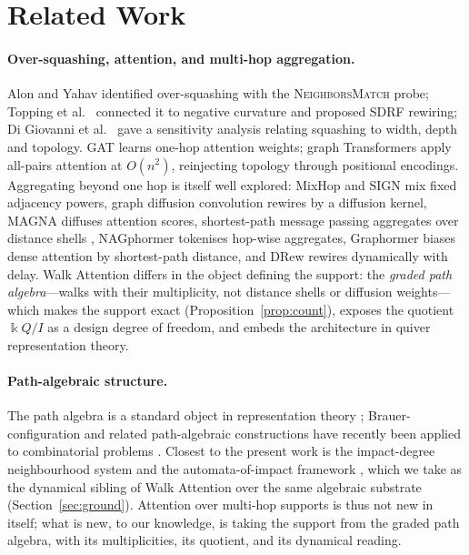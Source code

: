 \documentclass[runningheads]{llncs}
\newcommand{\kk}{\Bbbk}
\newcommand{\kQ}{\kk Q}
\begin{document}
\section{Related Work}\label{sec:related}

\paragraph{Over-squashing, attention, and multi-hop aggregation.}
Alon and Yahav \cite{alon2021bottleneck} identified over-squashing with the
\textsc{NeighborsMatch} probe; Topping et al.\ \cite{topping2022understanding}
connected it to negative curvature and proposed SDRF rewiring; Di Giovanni et
al.\ \cite{digiovanni2023oversquashing} gave a sensitivity analysis relating
squashing to width, depth and topology. GAT \cite{velickovic2017graph} learns
one-hop attention weights; graph Transformers apply all-pairs attention
\cite{vaswani2017attention} at $O(n^2)$, reinjecting topology through
positional encodings. Aggregating beyond one hop is itself well explored:
MixHop \cite{abu2019mixhop} and SIGN \cite{frasca2020sign} mix fixed adjacency
powers, graph diffusion convolution \cite{gasteiger2019diffusion} rewires by a
diffusion kernel, MAGNA \cite{wang2021magna} diffuses attention scores,
shortest-path message passing aggregates over distance shells
\cite{abboud2022shortest}, NAGphormer \cite{chen2023nagphormer} tokenises
hop-wise aggregates, Graphormer \cite{ying2021graphormer} biases dense
attention by shortest-path distance, and DRew \cite{gutteridge2023drew}
rewires dynamically with delay. Walk Attention differs in the object defining
the support: the \emph{graded path algebra}---walks with their multiplicity,
not distance shells or diffusion weights---which makes the support exact
(Proposition~\ref{prop:count}), exposes the quotient $\kQ/I$ as a design degree
of freedom, and embeds the architecture in quiver representation theory.

\paragraph{Path-algebraic structure.}
The path algebra is a standard object in representation theory
\cite{schiffler2014quiver,assem2006elements}; Brauer-configuration and related
path-algebraic constructions have recently been applied to combinatorial
problems \cite{moreno2021brauer,moreno2024integer}. Closest to the present work is the
impact-degree neighbourhood system and the automata-of-impact framework
\cite{zainea2026aiq,ibanez2025casimulations}, which we take as the dynamical
sibling of Walk Attention over the same algebraic substrate
(Section~\ref{sec:ground}). Attention over multi-hop supports is thus not new
in itself; what is new, to our knowledge, is taking the support from the graded
path algebra, with its multiplicities, its quotient, and its dynamical reading.
\end{document}

